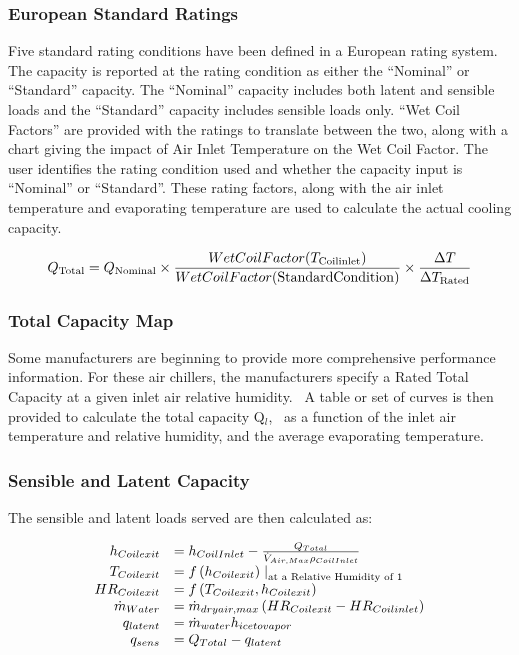 \subsubsection{European Standard Ratings}\label{european-standard-ratings}

Five standard rating conditions have been defined in a European rating system. The capacity is reported at the rating condition as either the ``Nominal'' or ``Standard'' capacity. The ``Nominal'' capacity includes both latent and sensible loads and the ``Standard'' capacity includes sensible loads only. ``Wet Coil Factors'' are provided with the ratings to translate between the two, along with a chart giving the impact of Air Inlet Temperature on the Wet Coil Factor. The user identifies the rating condition used and whether the capacity input is ``Nominal'' or ``Standard''. These rating factors, along with the air inlet temperature and evaporating temperature are used to calculate the actual cooling capacity.

\begin{equation}
{Q_{{\rm{Total}}}} = {Q_{{\rm{Nominal}}}} \times \frac{{WetCoilFactor({T_{{\rm{Coil inlet}}}})}}{{WetCoilFactor({\rm{Standard Condition}})}} \times \frac{{\Delta T}}{{\Delta {T_{{\rm{Rated}}}}}}
\end{equation}

\subsubsection{Total Capacity Map}\label{total-capacity-map}

Some manufacturers are beginning to provide more comprehensive performance information. For these air chillers, the manufacturers specify a Rated Total Capacity at a given inlet air relative humidity.~ A table or set of curves is then provided to calculate the total capacity Q\(_{l}\),~ as a function of the inlet air temperature and relative humidity, and the average evaporating temperature.

\subsubsection{Sensible and Latent Capacity}\label{sensible-and-latent-capacity}

The sensible and latent loads served are then calculated as:

\begin{equation}
  \begin{array}{rl}
      h_{Coil exit} &= h_{Coil Inlet} - \frac{Q_{Total}}{\dot{V}_{Air,Max} \rho_{Coil Inlet}} \\
      T_{Coil exit} &= f\PB{h_{Coil exit}}\left.\right|_{\text{at a Relative Humidity of 1}} \\
     HR_{Coil exit} &= f\PB{T_{Coil exit},h_{Coil exit}} \\
    \dot{m}_{Water} &= \dot{m}_{dryair,max} \PB{HR_{Coil exit} - HR_{Coil inlet}} \\
         q_{latent} &= \dot{m}_{water} h_{icetovapor} \\
           q_{sens} &= Q_{Total} - q_{latent}
  \end{array}
\end{equation}

